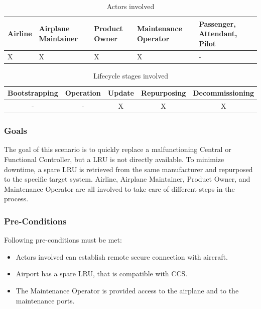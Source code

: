 \begin{table}
	\caption{Actors involved}
	\label{tab:Actors involved lru}
	\begin{center}
		\begin{tabular}{ |p{2.5cm}|p{2.5cm}|p{2.5cm}|p{2.5cm}|p{2.5cm}| }
			\hline
			Airline & Airplane Maintainer & Product Owner & Maintenance Operator & Passenger, Attendant, Pilot \\
			\hline
			X       & X                   & X             & X                    & -                           \\
			\hline
		\end{tabular}
	\end{center}
\end{table}

\begin{table}
	\caption{Lifecycle stages involved}
	\label{tab:Lifecycle stages involved lru}
	\begin{center}
		\begin{tabular}{ |c|c|c|c|c| }
			\hline
			Bootstrapping & Operation & Update & Repurposing & Decommissioning \\
			\hline
			-             & -         & X      & X           & X               \\
			\hline
		\end{tabular}
	\end{center}
\end{table}

\subsubsection{Goals}

The goal of this scenario is to quickly replace a malfunctioning Central or Functional Controller, but a LRU is not
directly available. To minimize downtime, a spare LRU is retrieved from the same manufacturer and repurposed to the
specific target system. Airline, Airplane Maintainer, Product Owner, and Maintenance Operator are all involved to take
care of different steps in the process.

\subsubsection{Pre-Conditions}

Following pre-conditions must be met:

\begin{itemize}
	\item Actors involved can establish remote secure connection with aircraft.
	\item Airport has a spare LRU, that is compatible with CCS.
	\item The Maintenance Operator is provided access to the airplane and to the maintenance ports.
\end{itemize}

